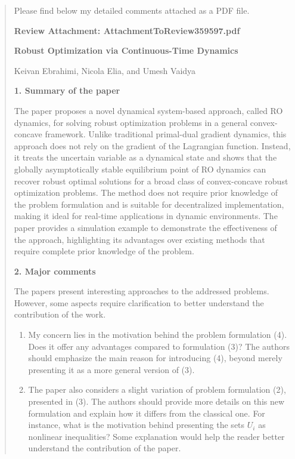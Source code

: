 \documentclass[journal,twoside,web]{ieeecolor}
\begin{document}
\begin{quote}
Please find below my detailed comments attached as a PDF file.

\textbf{Review Attachment: AttachmentToReview359597.pdf}

\textbf{Robust Optimization via Continuous-Time Dynamics}

Keivan Ebrahimi, Nicola Elia, and Umesh Vaidya

\textbf{1. Summary of the paper}

The paper proposes a novel dynamical system-based approach, called RO dynamics, for solving robust optimization problems in a general convex-concave framework. Unlike traditional primal-dual gradient dynamics, this approach does not rely on the gradient of the Lagrangian function. Instead, it treats the uncertain variable as a dynamical state and shows that the globally asymptotically stable equilibrium point of RO dynamics can recover robust optimal solutions for a broad class of convex-concave robust optimization problems. The method does not require prior knowledge of the problem formulation and is suitable for decentralized implementation, making it ideal for real-time applications in dynamic environments. The paper provides a simulation example to demonstrate the effectiveness of the approach, highlighting its advantages over existing methods that require complete prior knowledge of the problem.

\textbf{2. Major comments}

The papers present interesting approaches to the addressed problems. However, some aspects require clarification to better understand the contribution of the work.

\begin{enumerate}
\item My concern lies in the motivation behind the problem formulation (4). Does it offer any advantages compared to formulation (3)? The authors should emphasize the main reason for introducing (4), beyond merely presenting it as a more general version of (3).

\item The paper also considers a slight variation of problem formulation (2), presented in (3). The authors should provide more details on this new formulation and explain how it differs from the classical one. For instance, what is the motivation behind presenting the sets $U_i$ as nonlinear inequalities? Some explanation would help the reader better understand the contribution of the paper.


\end{enumerate}
\end{quote}
\end{document}
